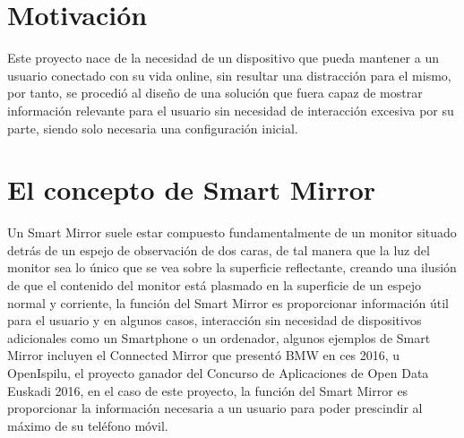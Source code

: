 \section{Motivación}

Este proyecto nace de la necesidad de un dispositivo que pueda mantener a un usuario conectado con su vida online, sin resultar una distracción para el mismo, por tanto, se procedió al diseño de una solución que fuera capaz de mostrar información relevante para el usuario sin necesidad de interacción excesiva por su parte, siendo solo necesaria una configuración inicial.

\section{El concepto de Smart Mirror}

Un Smart Mirror suele estar compuesto fundamentalmente de un monitor situado detrás de un espejo de observación de dos caras, de tal manera que la luz del monitor sea lo único que se vea sobre la superficie reflectante, creando una ilusión de que el contenido del monitor está plasmado en la superficie de un espejo normal y corriente, la función del Smart Mirror es proporcionar información útil para el usuario y en algunos casos, interacción sin necesidad de dispositivos adicionales como un Smartphone o un ordenador, algunos ejemplos de Smart Mirror incluyen el Connected Mirror que presentó BMW en \acrshort{ces} 2016, u OpenIspilu, el proyecto ganador del Concurso de Aplicaciones de Open Data Euskadi 2016, en el caso de este proyecto, la función del Smart Mirror es proporcionar la información necesaria a un usuario para poder prescindir al máximo de su teléfono móvil.